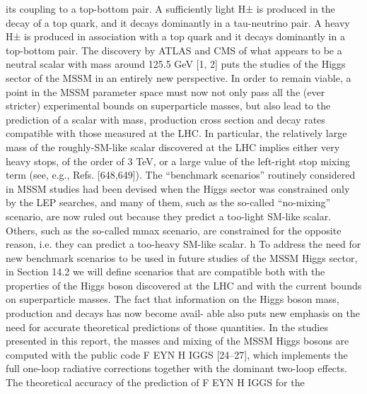 its coupling to a top-bottom pair. A sufficiently light H± is produced in the decay of a top quark, and it
decays dominantly in a tau-neutrino pair. A heavy H± is produced in association with a top quark and it
decays dominantly in a top-bottom pair.
The discovery by ATLAS and CMS of what appears to be a neutral scalar with mass around
125.5 GeV [1, 2] puts the studies of the Higgs sector of the MSSM in an entirely new perspective. In
order to remain viable, a point in the MSSM parameter space must now not only pass all the (ever
stricter) experimental bounds on superparticle masses, but also lead to the prediction of a scalar with
mass, production cross section and decay rates compatible with those measured at the LHC. In particular,
the relatively large mass of the roughly-SM-like scalar discovered at the LHC implies either very heavy
stops, of the order of 3 TeV, or a large value of the left-right stop mixing term (see, e.g., Refs. [648,649]).
The “benchmark scenarios” routinely considered in MSSM studies had been devised when the Higgs
sector was constrained only by the LEP searches, and many of them, such as the so-called “no-mixing”
scenario, are now ruled out because they predict a too-light SM-like scalar. Others, such as the so-called
mmax scenario, are constrained for the opposite reason, i.e. they can predict a too-heavy SM-like scalar.
h
To address the need for new benchmark scenarios to be used in future studies of the MSSM Higgs sector,
in Section 14.2 we will define scenarios that are compatible both with the properties of the Higgs boson
discovered at the LHC and with the current bounds on superparticle masses.
The fact that information on the Higgs boson mass, production and decays has now become avail-
able also puts new emphasis on the need for accurate theoretical predictions of those quantities. In the
studies presented in this report, the masses and mixing of the MSSM Higgs bosons are computed with
the public code F EYN H IGGS [24–27], which implements the full one-loop radiative corrections together
with the dominant two-loop effects. The theoretical accuracy of the prediction of F EYN H IGGS for the

